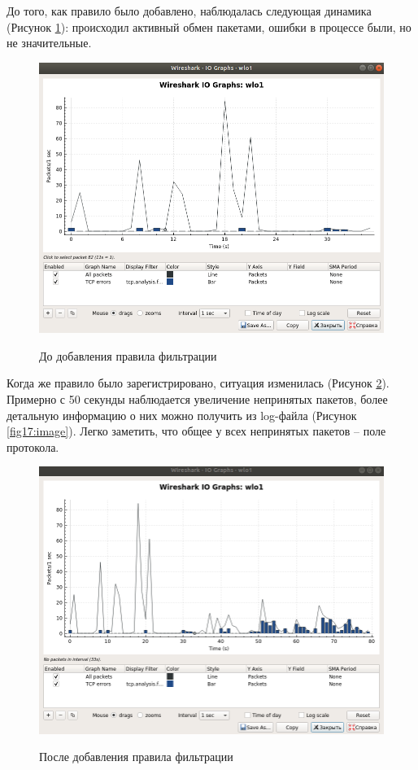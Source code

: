 До того, как правило было добавлено, наблюдалась следующая динамика (Рисунок \ref{fig15:image}): происходил активный обмен пакетами, ошибки в процессе были, но не значительные.
\begin{figure}[h]
	\begin{center}
		{\includegraphics[scale = 0.5]{img/screenshots/rule_protocol/1_rule_protocol.png}}
		\caption{До добавления правила фильтрации}
		\label{fig15:image}
	\end{center}
\end{figure}

Когда же правило было зарегистрировано, ситуация изменилась (Рисунок \ref{fig16:image}). Примерно с 50 секунды наблюдается увеличение непринятых пакетов, более детальную информацию о них можно получить из log-файла (Рисунок \ref{fig17:image}). Легко заметить, что общее у всех непринятых пакетов -- поле протокола. 
\begin{figure}[h]
	\begin{center}
		{\includegraphics[scale = 0.5]{img/screenshots/rule_protocol/2_rule_protocol.png}}
		\caption{После добавления правила фильтрации}
		\label{fig16:image}
	\end{center}
\end{figure}

